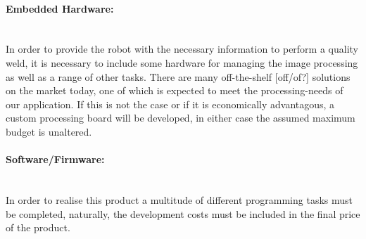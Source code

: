 \documentclass[11pt,a4paper]{article}
\begin{document}
\paragraph{Embedded Hardware:}~\\
In order to provide the robot with the necessary information to perform a quality weld, it is necessary to include some hardware for managing the image processing as well as a range of other tasks. There are many off-the-shelf [off/of?] solutions on the market today, one of which is expected to meet the processing-needs of our application. If this is not the case or if it is economically advantagous, a custom processing board will be developed, in either case the assumed maximum budget is unaltered.
\paragraph{Software/Firmware:}~\\
In order to realise this product a multitude of different programming tasks must be completed, naturally, the development costs must be included in the final price of the product.
\end{document}
